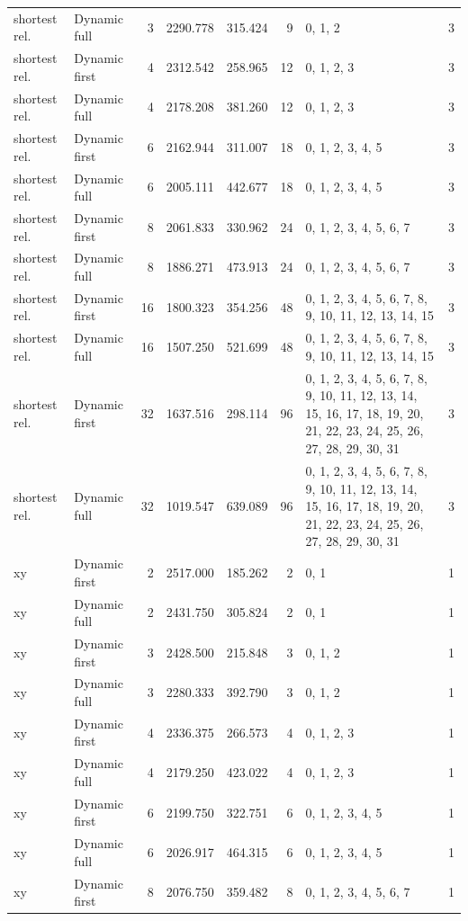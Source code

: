 \documentclass[10pt,a4paper]{article}
\begin{document}
\begin{longtable}{@{}p{23mm}p{29mm}rrrrp{36mm}r@{}}
shortest rel. & Dynamic full & 3 & 2290.778 & 315.424 & 9 & 0, 1, 2 & 3 \\
shortest rel. & Dynamic first & 4 & 2312.542 & 258.965 & 12 & 0, 1, 2, 3 & 3 \\
shortest rel. & Dynamic full & 4 & 2178.208 & 381.260 & 12 & 0, 1, 2, 3 & 3 \\
shortest rel. & Dynamic first & 6 & 2162.944 & 311.007 & 18 & 0, 1, 2, 3, 4, 5 & 3 \\
shortest rel. & Dynamic full & 6 & 2005.111 & 442.677 & 18 & 0, 1, 2, 3, 4, 5 & 3 \\
shortest rel. & Dynamic first & 8 & 2061.833 & 330.962 & 24 & 0, 1, 2, 3, 4, 5, 6, 7 & 3 \\
shortest rel. & Dynamic full & 8 & 1886.271 & 473.913 & 24 & 0, 1, 2, 3, 4, 5, 6, 7 & 3 \\
shortest rel. & Dynamic first & 16 & 1800.323 & 354.256 & 48 & 0, 1, 2, 3, 4, 5, 6, 7, 8, 9, 10, 11, 12, 13, 14, 15 & 3 \\
shortest rel. & Dynamic full & 16 & 1507.250 & 521.699 & 48 & 0, 1, 2, 3, 4, 5, 6, 7, 8, 9, 10, 11, 12, 13, 14, 15 & 3 \\
shortest rel. & Dynamic first & 32 & 1637.516 & 298.114 & 96 & 0, 1, 2, 3, 4, 5, 6, 7, 8, 9, 10, 11, 12, 13, 14, 15, 16, 17, 18, 19, 20, 21, 22, 23, 24, 25, 26, 27, 28, 29, 30, 31 & 3 \\
shortest rel. & Dynamic full & 32 & 1019.547 & 639.089 & 96 & 0, 1, 2, 3, 4, 5, 6, 7, 8, 9, 10, 11, 12, 13, 14, 15, 16, 17, 18, 19, 20, 21, 22, 23, 24, 25, 26, 27, 28, 29, 30, 31 & 3 \\
xy & Dynamic first & 2 & 2517.000 & 185.262 & 2 & 0, 1 & 1 \\
xy & Dynamic full & 2 & 2431.750 & 305.824 & 2 & 0, 1 & 1 \\
xy & Dynamic first & 3 & 2428.500 & 215.848 & 3 & 0, 1, 2 & 1 \\
xy & Dynamic full & 3 & 2280.333 & 392.790 & 3 & 0, 1, 2 & 1 \\
xy & Dynamic first & 4 & 2336.375 & 266.573 & 4 & 0, 1, 2, 3 & 1 \\
xy & Dynamic full & 4 & 2179.250 & 423.022 & 4 & 0, 1, 2, 3 & 1 \\
xy & Dynamic first & 6 & 2199.750 & 322.751 & 6 & 0, 1, 2, 3, 4, 5 & 1 \\
xy & Dynamic full & 6 & 2026.917 & 464.315 & 6 & 0, 1, 2, 3, 4, 5 & 1 \\
xy & Dynamic first & 8 & 2076.750 & 359.482 & 8 & 0, 1, 2, 3, 4, 5, 6, 7 & 1 \\

\end{longtable}
\end{document}
